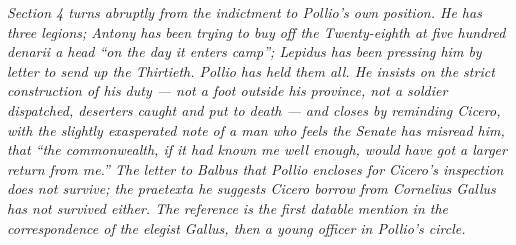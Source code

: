 \textit{Section 4 turns abruptly from the indictment to
Pollio's own position. He has three legions; Antony has
been trying to buy off the Twenty-eighth at five hundred
denarii a head ``on the day it enters camp''; Lepidus has
been pressing him by letter to send up the Thirtieth.
Pollio has held them all. He insists on the strict
construction of his duty --- not a foot outside his
province, not a soldier dispatched, deserters caught and
put to death --- and closes by reminding Cicero, with the
slightly exasperated note of a man who feels the Senate
has misread him, that ``the commonwealth, if it had known
me well enough, would have got a larger return from me.''
The letter to Balbus that Pollio encloses for Cicero's
inspection does not survive; the \textit{praetexta} he
suggests Cicero borrow from Cornelius Gallus has not
survived either. The reference is the first datable
mention in the correspondence of the elegist Gallus, then
a young officer in Pollio's circle.}
